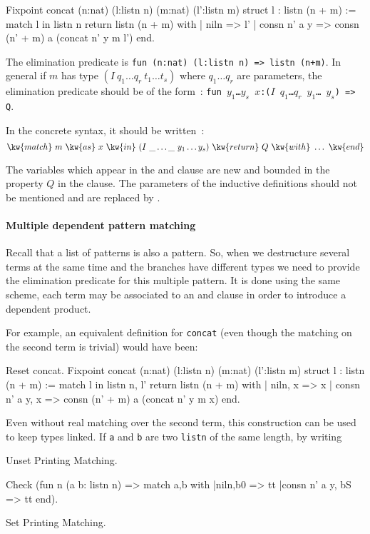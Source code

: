 \begin{coq_example}
Fixpoint concat (n:nat) (l:listn n) (m:nat) (l':listn m) {struct l} :
 listn (n + m) :=
  match l in listn n return listn (n + m) with
  | niln => l'
  | consn n' a y => consn (n' + m) a (concat n' y m l')
  end.
\end{coq_example}
The elimination predicate is {\tt fun (n:nat) (l:listn n) => listn~(n+m)}.
In general if $m$ has type $(I~q_1\ldots q_r~t_1\ldots t_s)$ where 
$q_1\ldots q_r$ are parameters, the elimination predicate should be of
the form~:
{\tt fun $y_1$\ldots $y_s$ $x$:($I$~$q_1$\ldots $q_r$~$y_1$\ldots
  $y_s$) => Q}.

In the concrete syntax, it should be written~:
\[ \kw{match}~m~\kw{as}~x~\kw{in}~(I~\_\ldots \_~y_1\ldots y_s)~\kw{return}~Q~\kw{with}~\ldots~\kw{end}\]

The variables which appear in the  and  clause are new
and bounded in the property $Q$ in the  clause. The
parameters of the inductive definitions should not be mentioned and
are replaced by \kw{\_}.

\paragraph{Multiple dependent pattern matching}
Recall that a list of patterns is also a pattern. So, when we destructure several
terms at the same time and the branches have different types we need to provide the
elimination predicate for this multiple pattern. It is done using the same
scheme, each term may be associated to an  and  clause in order to
introduce a dependent product.

For example, an equivalent definition for \texttt{concat} (even though the
matching on the second term is trivial) would have been:

\begin{coq_example}
Reset concat.
Fixpoint concat (n:nat) (l:listn n) (m:nat) (l':listn m) {struct l} :
 listn (n + m) :=
  match l in listn n, l' return listn (n + m) with
  | niln, x => x
  | consn n' a y, x => consn (n' + m) a (concat n' y m x)
  end.
\end{coq_example}

Even without real matching over the second term, this construction can be used to
keep types linked.  If {\tt a} and {\tt b} are two {\tt listn} of the same length,
by writing
\begin{coq_eval}
  Unset Printing Matching.
\end{coq_eval}
\begin{coq_example}
Check (fun n (a b: listn n) => match a,b with
 |niln,b0 => tt
 |consn n' a y, bS => tt
end).
\end{coq_example}
\begin{coq_eval}
  Set Printing Matching.
\end{coq_eval}

